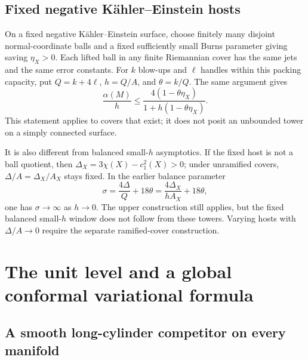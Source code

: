 \documentclass[11pt]{article}
\theoremstyle{definition}
\theoremstyle{remark}
\begin{document}
\subsection{Fixed negative K\"ahler--Einstein hosts}

On a fixed negative K\"ahler--Einstein surface, choose finitely many
disjoint normal-coordinate balls and a fixed sufficiently small Burns
parameter giving saving $\eta_X>0$. Each lifted ball in any finite
Riemannian cover has the same jets and the same error constants.
For $k$ blow-ups and $\ell$ handles within this packing capacity, put
$Q=k+4\ell$, $h=Q/A$, and $\theta=k/Q$. The same argument gives
\begin{equation}
 \frac{\alpha(M)}h\le
 \frac{4(1-\theta\eta_X)}{1+h(1-\theta\eta_X)}.
 \label{eq:KE-cover-upper}
\end{equation}
This statement applies to covers that exist; it does not posit an
unbounded tower on a simply connected surface.

It is also different from balanced small-$h$ asymptotics.
If the fixed host is not a ball quotient, then
$\Delta_X=3\chi(X)-c_1^2(X)>0$; under unramified covers,
$\Delta/A=\Delta_X/A_X$ stays fixed. In the earlier balance parameter
\[
 \sigma=\frac{4\Delta}{Q}+18\theta
        =\frac{4\Delta_X}{hA_X}+18\theta,
\]
one has $\sigma\to\infty$ as $h\to0$.
The upper construction still applies, but the fixed balanced small-$h$
window does not follow from these towers. Varying hosts with
$\Delta/A\to0$ require the separate ramified-cover construction.

\section{The unit level and a global conformal variational formula}
\label{sec:weyl-law}

\subsection{A smooth long-cylinder competitor on every manifold}
\end{document}

